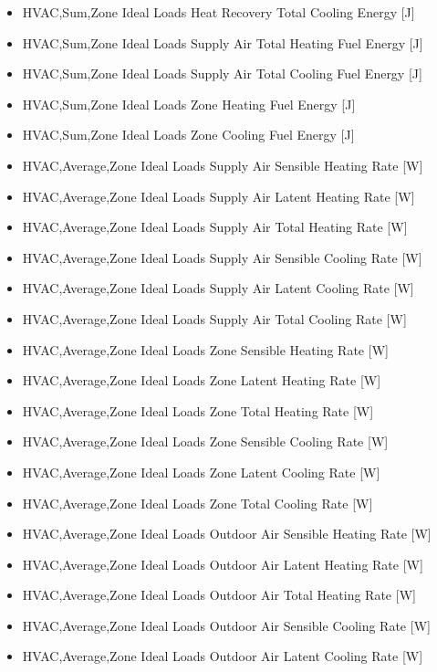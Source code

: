 \begin{itemize}
  HVAC,Sum,Zone Ideal Loads Heat Recovery Latent Cooling Energy {[}J{]}
\item
  HVAC,Sum,Zone Ideal Loads Heat Recovery Total Cooling Energy {[}J{]}
\item
  HVAC,Sum,Zone Ideal Loads Supply Air Total Heating Fuel Energy {[}J{]}
\item
  HVAC,Sum,Zone Ideal Loads Supply Air Total Cooling Fuel Energy {[}J{]}
\item
  HVAC,Sum,Zone Ideal Loads Zone Heating Fuel Energy {[}J{]}
\item
  HVAC,Sum,Zone Ideal Loads Zone Cooling Fuel Energy {[}J{]}
\item
  HVAC,Average,Zone Ideal Loads Supply Air Sensible Heating Rate {[}W{]}
\item
  HVAC,Average,Zone Ideal Loads Supply Air Latent Heating Rate {[}W{]}
\item
  HVAC,Average,Zone Ideal Loads Supply Air Total Heating Rate {[}W{]}
\item
  HVAC,Average,Zone Ideal Loads Supply Air Sensible Cooling Rate {[}W{]}
\item
  HVAC,Average,Zone Ideal Loads Supply Air Latent Cooling Rate {[}W{]}
\item
  HVAC,Average,Zone Ideal Loads Supply Air Total Cooling Rate {[}W{]}
\item
  HVAC,Average,Zone Ideal Loads Zone Sensible Heating Rate {[}W{]}
\item
  HVAC,Average,Zone Ideal Loads Zone Latent Heating Rate {[}W{]}
\item
  HVAC,Average,Zone Ideal Loads Zone Total Heating Rate {[}W{]}
\item
  HVAC,Average,Zone Ideal Loads Zone Sensible Cooling Rate {[}W{]}
\item
  HVAC,Average,Zone Ideal Loads Zone Latent Cooling Rate {[}W{]}
\item
  HVAC,Average,Zone Ideal Loads Zone Total Cooling Rate {[}W{]}
\item
  HVAC,Average,Zone Ideal Loads Outdoor Air Sensible Heating Rate {[}W{]}
\item
  HVAC,Average,Zone Ideal Loads Outdoor Air Latent Heating Rate {[}W{]}
\item
  HVAC,Average,Zone Ideal Loads Outdoor Air Total Heating Rate {[}W{]}
\item
  HVAC,Average,Zone Ideal Loads Outdoor Air Sensible Cooling Rate {[}W{]}
\item
  HVAC,Average,Zone Ideal Loads Outdoor Air Latent Cooling Rate {[}W{]}

\end{itemize}
